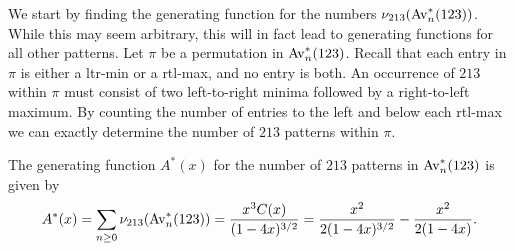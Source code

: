     We start by finding the generating function for the numbers
    $\nu_{213}(\operatorname{{Av}}_n^*(123))$. While this may seem arbitrary, this will in fact lead
    to generating functions for all other patterns.  Let $\pi$ be a permutation
    in $\operatorname{{Av}}_n^*(123)$. Recall that each entry in $\pi$ is either a ltr-min or a
    rtl-max, and no entry is both. An occurrence of $213$ within $\pi$ must
    consist of two left-to-right minima followed by a right-to-left maximum. By
    counting the number of entries to the left and below each rtl-max we can
    exactly determine the number of $213$ patterns within $\pi$. 
    
    \begin{lemma} \label{lemma:213pats}
      The generating function $A^*(x)$ for the number of $213$ patterns in
      $\operatorname{{Av}}_n^*(123)$ is given by
      $$ A^*(x) = \sum_{n\geq 0} \nu_{213}(\operatorname{{Av}}_n^*(123)) =
      \frac{x^3C(x)}{(1-4x)^{3/2}} = \frac{x^2}{2(1-4x)^{3/2}} -
      \frac{x^2}{2(1-4x)}.$$
    \end{lemma}
